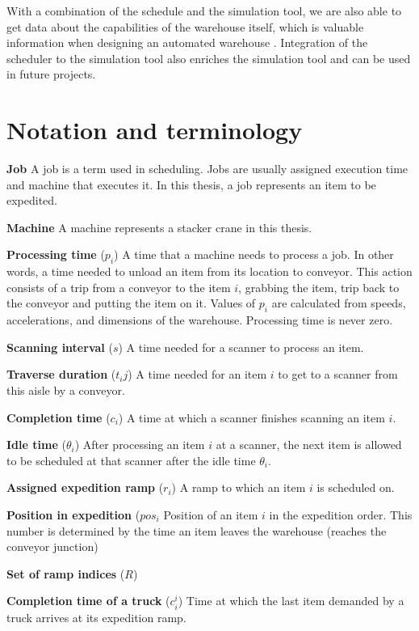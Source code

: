 \documentclass{ctuthesis}
\begin{document}
With a combination of the schedule and the simulation tool, we are also able to get data about the capabilities of the warehouse itself, which is valuable information when designing an automated warehouse \cite{review}. Integration of the scheduler to the simulation tool also enriches the simulation tool and can be used in future projects.


\section{Notation and terminology}

\noindent \textbf{Job} A job is a term used in scheduling. Jobs are usually assigned execution time and machine that executes it. In this thesis, a job represents an item to be expedited. 

\noindent \textbf{Machine} A machine represents a stacker crane in this thesis.

\noindent \textbf{Processing time} ($p_i$) A time that a machine needs to process a job. In other words, a time needed to unload an item from its location to conveyor. This action consists of a trip from a conveyor to the item $i$, grabbing the item, trip back to the conveyor and putting the item on it. Values of $p_i$ are calculated from speeds, accelerations, and dimensions of the warehouse. Processing time is never zero.

\noindent \textbf{Scanning interval} ($s$) A time needed for a scanner to process an item.

\noindent \textbf{Traverse duration} ($t_ij$) A time needed for an item $i$ to get to a scanner from this aisle by a conveyor.

\noindent \textbf{Completion time} ($c_i$) A time at which a scanner finishes scanning an item $i$.

\noindent \textbf{Idle time} ($\theta_i$) After processing an item $i$ at a scanner, the next item is allowed to be scheduled at that scanner after the idle time $\theta_i$.

\noindent \textbf{Assigned expedition ramp} ($r_i$) A ramp to which an item $i$ is scheduled on.

\noindent \textbf{Position in expedition} ($pos_i$ Position of an item $i$ in the expedition order. This number is determined by the time an item leaves the warehouse (reaches the conveyor junction)

\noindent \textbf{Set of ramp indices} ($R$) 

\noindent \textbf{Completion time of a truck} ($c_i^i$) Time at which the last item demanded by a truck arrives at its expedition ramp.
\end{document}
